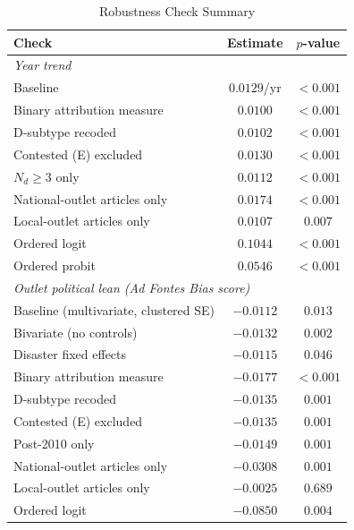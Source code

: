 \documentclass[12pt]{article}
\begin{document}
\begin{table}[ht]
\centering
\caption{Robustness Check Summary}
\label{tab:robustness_summary}
\begin{threeparttable}
\begin{tabular}{lcc}
\toprule
Check & Estimate & $p$-value \\
\midrule
\multicolumn{3}{l}{\emph{Year trend}} \\
\quad Baseline                              & $0.0129$/yr & $<0.001$ \\
\quad Binary attribution measure            & $0.0100$    & $<0.001$ \\
\quad D-subtype recoded                     & $0.0102$    & $<0.001$ \\
\quad Contested (E) excluded                & $0.0130$    & $<0.001$ \\
\quad $N_d \geq 3$ only                     & $0.0112$    & $<0.001$ \\
\quad National-outlet articles only         & $0.0174$    & $<0.001$ \\
\quad Local-outlet articles only            & $0.0107$    & $0.007$ \\
\quad Ordered logit                         & $0.1044$    & $<0.001$ \\
\quad Ordered probit                        & $0.0546$    & $<0.001$ \\
\midrule
\multicolumn{3}{l}{\emph{Outlet political lean (Ad Fontes Bias score)}} \\
\quad Baseline (multivariate, clustered SE) & $-0.0112$   & $0.013$ \\
\quad Bivariate (no controls)               & $-0.0132$   & $0.002$ \\
\quad Disaster fixed effects                & $-0.0115$   & $0.046$ \\
\quad Binary attribution measure            & $-0.0177$   & $<0.001$ \\
\quad D-subtype recoded                     & $-0.0135$   & $0.001$ \\
\quad Contested (E) excluded                & $-0.0135$   & $0.001$ \\
\quad Post-2010 only                        & $-0.0149$   & $0.001$ \\
\quad National-outlet articles only         & $-0.0308$   & $0.001$ \\
\quad Local-outlet articles only            & $-0.0025$   & $0.689$ \\
\quad Ordered logit                         & $-0.0850$   & $0.004$ \\

\end{tabular}
\end{threeparttable}
\end{table}
\end{document}
